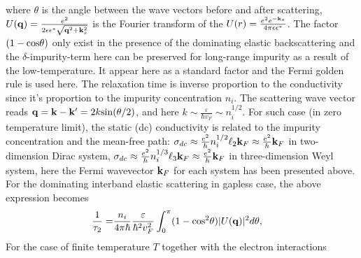 \documentclass[UTF8,a4paper]{article}
\begin{document}
\begin{large}
\begin{equation}
\end{equation}
where $\theta$ is the angle between the wave vectors before and after scattering,
$U({\bf q})=\frac{e^{2}}{2\epsilon\epsilon^{*}\sqrt{{\bf q}^{2}+{\bf k}_{s}^{2}}}$ is the Fourier transform of the 
$U(r)=\frac{e^{2}e^{-{\bf k}_{s}}}{4\pi\epsilon\epsilon^{*}}$.
The factor $(1-{\rm cos}\theta)$ only exist in the presence of the dominating elastic backscattering
and the $\delta$-impurity-term here can be preserved for long-range impurity as a result of the low-temperature.
It appear here as a standard factor\cite{Burkov A A,Stauber T}
and the Fermi golden rule is used here.
The relaxation time is inverse proportion to the conductivity since it's  proportion to the impurity concentration $n_{i}$.
The scattering wave vector reads
${\bf q}={\bf k}-{\bf k}'=2k{\rm sin}(\theta/2)$\cite{Shakouri K,Vargiamidis V},
and here $k\sim \frac{\varepsilon}{\hbar v_{F}}\sim n_{i}^{1/2}$.
For such case (in zero temperature limit), the static (dc) conductivity is related to the impurity concentration and the mean-free path:
$\sigma_{dc}\approx \frac{e^{2}}{h}n_{i}^{1/2}\ell_{2}{\bf k}_{F}\approx \frac{e^{2}}{h}{\bf k}_{F}$ in two-dimension Dirac system,
$\sigma_{dc}\approx \frac{e^{2}}{h}n_{i}^{1/3}\ell_{3}{\bf k}_{F}\approx \frac{e^{2}}{h}{\bf k}_{F}$ in three-dimension Weyl system,
here the Fermi wavevector ${\bf k}_{F}$ for each system has been presented above.
For the dominating interband elastic scattering in gapless case,
the above expression becomes\cite{Vargiamidis V}
\begin{equation} 
\begin{aligned}
\frac{1}{\tau_{2}}
=&\frac{n_{i}}{4\pi\hbar}\frac{\varepsilon}{\hbar^{2}v_{F}^{2}}\int^{\pi}_{0} (1-{\rm cos}^{2}\theta)|U({\bf q})|^{2}d\theta,
\end{aligned}
\end{equation}
For the case of finite temperature $T$ together with the electron interactions

\end{large}
\end{document}
